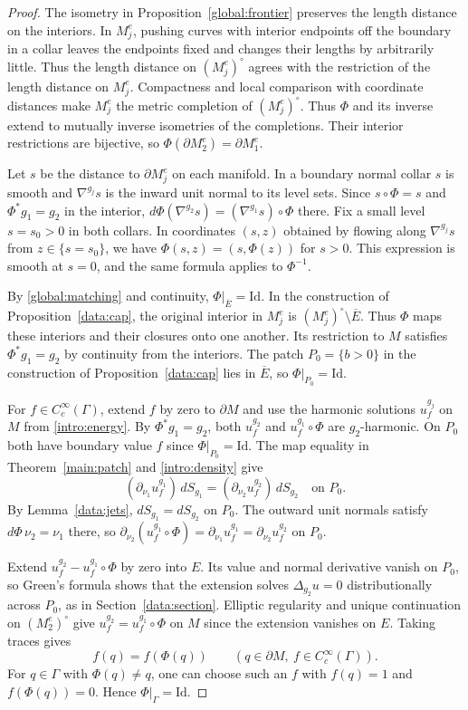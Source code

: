 \documentclass[11pt,a4paper]{article}
\theoremstyle{definition}
\theoremstyle{remark}
\newcommand{\Id}{\mathrm{Id}}
\numberwithin{equation}{section}
\begin{document}
\begin{proof}
The isometry in Proposition~\ref{global:frontier} preserves the
length distance on the interiors. In $M_j^e$, pushing curves with
interior endpoints off the boundary in a collar leaves the
endpoints fixed and changes their lengths by arbitrarily little.
Thus the length distance on $(M_j^e)^\circ$ agrees with the
restriction of the length distance on $M_j^e$. Compactness and local
comparison with coordinate distances make $M_j^e$ the metric
completion of $(M_j^e)^\circ$. Thus $\Phi$ and its inverse extend
to mutually inverse isometries of the completions. Their interior
restrictions are bijective, so $\Phi(\partial M_2^e)=\partial M_1^e$.

Let $s$ be the distance to $\partial M_j^e$ on each manifold.
In a boundary normal collar $s$ is smooth and $\nabla^{g_j}s$
is the inward unit normal to its level sets. Since $s\circ\Phi=s$
and $\Phi^*g_1=g_2$ in the interior,
$d\Phi(\nabla^{g_2}s)=(\nabla^{g_1}s)\circ\Phi$ there.
Fix a small level $s=s_0>0$ in both collars. In coordinates
$(s,z)$ obtained by flowing along $\nabla^{g_j}s$ from
$z\in\{s=s_0\}$, we have $\Phi(s,z)=(s,\Phi(z))$ for $s>0$.
This expression is smooth at $s=0$, and the same formula applies
to $\Phi^{-1}$.

By \eqref{global:matching} and continuity, $\Phi|_{\overline E}=\Id$.
In the construction of Proposition~\ref{data:cap}, the original
interior in $M_j^e$ is $(M_j^e)^\circ\setminus\overline E$.
Thus $\Phi$ maps these interiors and their closures onto one
another. Its restriction to $M$ satisfies $\Phi^*g_1=g_2$ by
continuity from the interiors. The patch $P_0=\{b>0\}$ in the
construction of Proposition~\ref{data:cap} lies in $\overline E$,
so $\Phi|_{P_0}=\Id$.

For $f\in C_c^\infty(\Gamma)$, extend $f$ by zero to $\partial M$
and use the harmonic solutions $u_f^{g_j}$ on $M$ from
\eqref{intro:energy}. By $\Phi^*g_1=g_2$, both $u_f^{g_2}$ and
$u_f^{g_1}\circ\Phi$ are $g_2$-harmonic. On $P_0$ both have
boundary value $f$ since $\Phi|_{P_0}=\Id$. The map equality in
Theorem~\ref{main:patch} and \eqref{intro:density} give
\[
 (\partial_{\nu_1}u_f^{g_1})\,dS_{g_1}
   =(\partial_{\nu_2}u_f^{g_2})\,dS_{g_2}
   \quad\text{on }P_0.
\]
By Lemma~\ref{data:jets}, $dS_{g_1}=dS_{g_2}$ on $P_0$.
The outward unit normals satisfy $d\Phi\,\nu_2=\nu_1$ there, so
$\partial_{\nu_2}(u_f^{g_1}\circ\Phi)=
\partial_{\nu_1}u_f^{g_1}=\partial_{\nu_2}u_f^{g_2}$ on $P_0$.

Extend $u_f^{g_2}-u_f^{g_1}\circ\Phi$ by zero into $E$.
Its value and normal derivative vanish on $P_0$, so Green's
formula shows that the extension solves $\Delta_{g_2}u=0$
distributionally across $P_0$, as in Section~\ref{data:section}.
Elliptic regularity and unique
continuation on $(M_2^e)^\circ$ give $u_f^{g_2}=u_f^{g_1}\circ\Phi$
on $M$ since the extension vanishes on $E$.
Taking traces gives
\[
 f(q)=f(\Phi(q))\qquad(q\in\partial M,\ f\in C_c^\infty(\Gamma)).
\]
For $q\in\Gamma$ with $\Phi(q)\ne q$, one can choose such an $f$
with $f(q)=1$ and $f(\Phi(q))=0$. Hence $\Phi|_\Gamma=\Id$.
\end{proof}
\end{document}
